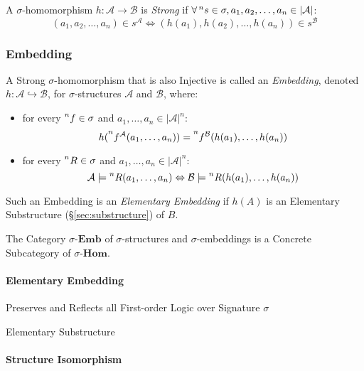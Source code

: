 A $\sigma$-homomorphism $h : \mathcal{A} \rightarrow \mathcal{B}$ is
\emph{Strong} if $\forall \prescript{n}{}{s} \in \sigma, a_1,
a_2,\ldots, a_n \in |\mathcal{A}|$:
\[
  (a_1, a_2,\ldots, a_n) \in s^\mathcal{A} \Leftrightarrow
  (h(a_1), h(a_2),\ldots,h(a_n)) \in s^\mathcal{B}
\]



\subsubsection{Embedding}\label{sec:embedding}

A Strong $\sigma$-homomorphism that is also Injective is called an
\emph{Embedding}, denoted $h : \mathcal{A} \hookrightarrow
\mathcal{B}$, for $\sigma$-structures $\mathcal{A}$ and $\mathcal{B}$,
where:
\begin{itemize}
\item for every $\prescript{n}{}{f} \in \sigma$ and $a_1, \ldots, a_n
  \in |\mathcal{A}|^n$:
  \[
    h(\prescript{n}{}{f^\mathcal{A}}(a_1,\ldots,a_n)) =
    \prescript{n}{}{f^\mathcal{B}}(h(a_1),\ldots,h(a_n))
  \]
\item for every $\prescript{n}{}{R} \in \sigma$ and $a_1, \ldots, a_n
  \in |\mathcal{A}|^n$:
  \[
    \mathcal{A} \models \prescript{n}{}{R}(a_1, \ldots, a_n)
    \Leftrightarrow \mathcal{B} \models \prescript{n}{}{R}(h(a_1),
    \ldots, h(a_n))
  \]
\end{itemize}
Such an Embedding is an \emph{Elementary Embedding} if $h(A)$ is an
Elementary Substructure (\S\ref{sec:substructure}) of $B$.

The Category $\sigma$-$\mathbf{Emb}$ of $\sigma$-structures and
$\sigma$-embeddings is a Concrete Subcategory of
$\sigma$-$\mathbf{Hom}$.



\paragraph{Elementary Embedding}\label{sec:elementary_embedding}\hfill

Preserves and Reflects all First-order Logic over Signature $\sigma$

Elementary Substructure



\paragraph{Structure Isomorphism}\label{sec:structure_isomorphism}\hfill

